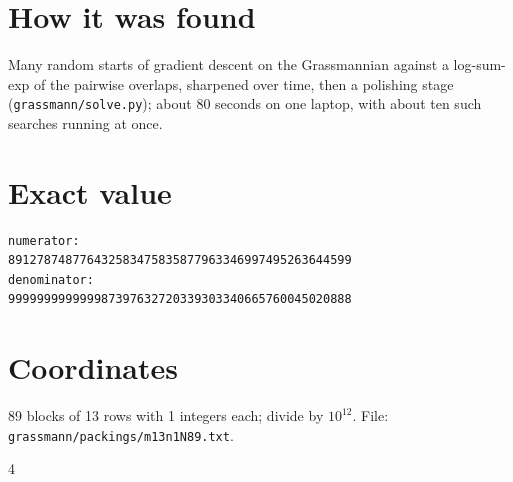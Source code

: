 \documentclass[11pt,a4paper]{article}
\begin{document}
\section{How it was found}
Many random starts of gradient descent on the Grassmannian against a log-sum-exp of the pairwise overlaps, sharpened over time, then a polishing stage (\texttt{grassmann/solve.py}); about 80 seconds on one laptop, with about ten such searches running at once.


\appendix
\section{Exact value}
{\small
\begin{verbatim}
numerator:
891278748776432583475835877963346997495263644599
denominator:
999999999999987397632720339303340665760045020888
\end{verbatim}}

\section{Coordinates}
89 blocks of 13 rows with 1 integers each; divide by $10^{12}$. File: \texttt{grassmann/packings/m13n1N89.txt}.
{\tiny
\begin{multicols}{4}
\end{multicols}}
\end{document}
